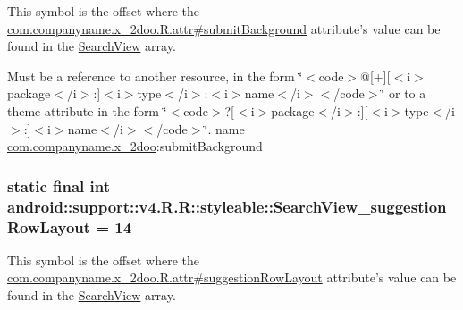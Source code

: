 This symbol is the offset where the \hyperlink{classcom_1_1companyname_1_1x__2doo_1_1_r_1_1attr_97fe3d42a75cb3e115411618038eea4b}{com.companyname.x\_\-2doo.R.attr\#submitBackground} attribute's value can be found in the \hyperlink{classandroid_1_1support_1_1v4_1_1_r_1_1styleable_63a589da97c59fb7eebd9759edb31f0d}{SearchView} array.

Must be a reference to another resource, in the form \char`\"{}$<$code$>$@\mbox{[}+\mbox{]}\mbox{[}$<$i$>$package$<$/i$>$:\mbox{]}$<$i$>$type$<$/i$>$:$<$i$>$name$<$/i$>$$<$/code$>$\char`\"{} or to a theme attribute in the form \char`\"{}$<$code$>$?\mbox{[}$<$i$>$package$<$/i$>$:\mbox{]}\mbox{[}$<$i$>$type$<$/i$>$:\mbox{]}$<$i$>$name$<$/i$>$$<$/code$>$\char`\"{}.  name \hyperlink{namespacecom_1_1companyname_1_1x__2doo}{com.companyname.x\_\-2doo}:submitBackground \hypertarget{classandroid_1_1support_1_1v4_1_1_r_1_1styleable_603a0727c95352880049f37bb9b130ed}{
\subsubsection[{SearchView\_\-suggestionRowLayout}]{\setlength{\rightskip}{0pt plus 5cm}static final int android::support::v4.R.R::styleable::SearchView\_\-suggestionRowLayout = 14}}
\label{classandroid_1_1support_1_1v4_1_1_r_1_1styleable_603a0727c95352880049f37bb9b130ed}


This symbol is the offset where the \hyperlink{classcom_1_1companyname_1_1x__2doo_1_1_r_1_1attr_f23b775aacd3e60fa26f47ea6dca2853}{com.companyname.x\_\-2doo.R.attr\#suggestionRowLayout} attribute's value can be found in the \hyperlink{classandroid_1_1support_1_1v4_1_1_r_1_1styleable_63a589da97c59fb7eebd9759edb31f0d}{SearchView} array.

